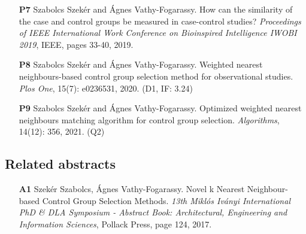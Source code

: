 \begin{itemize}
			\item[\textbf{P7}] Szabolcs Szekér and Ágnes Vathy-Fogarassy. How can the similarity of the case and control groups be measured in case-control studies? \textit{Proceedings of IEEE International Work Conference on Bioinspired Intelligence IWOBI 2019}, IEEE, pages 33-40, 2019.
			\item[\textbf{P8}] Szabolcs Szekér and Ágnes Vathy-Fogarassy. Weighted nearest neighbours-based control group selection method for observational studies. \textit{Plos One}, 15(7): e0236531, 2020. (D1, IF: 3.24)
			\item[\textbf{P9}] Szabolcs Szekér and Ágnes Vathy-Fogarassy. Optimized weighted nearest neighbours matching algorithm for control group selection. \textit{Algorithms}, 14(12): 356, 2021. (Q2)
			      			      			      			      	      	      			
		\end{itemize}
		
		\subsection*{Related abstracts}
										
		\begin{itemize}
			\item [\textbf{A1}] Szekér Szabolcs, Ágnes Vathy-Fogarassy. Novel k Nearest Neighbour-based Control Group Selection Methods. \textit{13th Miklós Iványi International PhD \& DLA Symposium - Abstract Book: Architectural, Engineering and Information Sciences}, Pollack Press, page 124, 2017.
			      			
			      			      			      			      	      	      			
		\end{itemize}
